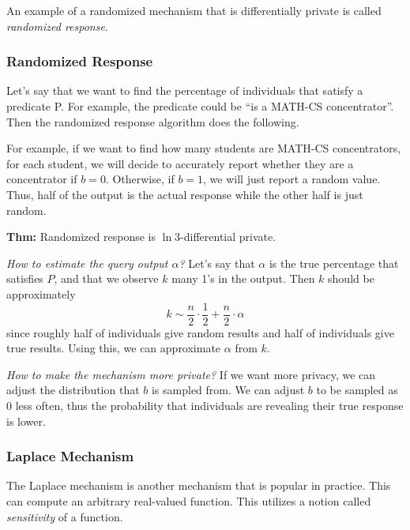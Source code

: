 An example of a randomized mechanism that is differentially private is called \textit{randomized response}.

\subsubsection{Randomized Response}

Let's say that we want to find the percentage of individuals that satisfy a predicate P. For example, the predicate could be ``is a MATH-CS concentrator''. Then the randomized response algorithm does the following.


For example, if we want to find how many students are MATH-CS concentrators, for each student, we will decide to accurately report whether they are a concentrator if $b=0$. Otherwise, if $b=1$, we will just report a random value. Thus, half of the output is the actual response while the other half is just random.

\textbf{Thm:} Randomized response is $\ln 3$-differential private.

\textit{How to estimate the query output $\alpha$?} Let's say that $\alpha$ is the true percentage that satisfies $P$, and that we observe $k$ many 1's in the output. Then $k$ should be approximately
$$k \sim \frac{n}{2}\cdot\frac{1}{2} + \frac{n}{2}\cdot \alpha$$
since roughly half of individuals give random results and half of individuals give true results. Using this, we can approximate $\alpha$ from $k$.

\textit{How to make the mechanism more private?} If we want more privacy, we can adjust the distribution that $b$ is sampled from. We can adjust $b$ to be sampled as $0$ less often, thus the probability that individuals are revealing their true response is lower.

\subsubsection{Laplace Mechanism}

The Laplace mechanism is another mechanism that is popular in practice. This can compute an arbitrary real-valued function. This utilizes a notion called \textit{sensitivity} of a function.

